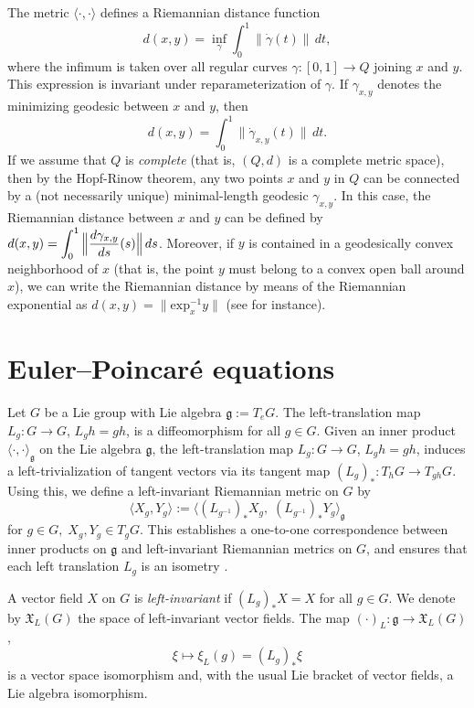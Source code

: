 \documentclass[letterpaper, 10 pt, conference]{ieeeconf}
\newcommand{\g}{\mathfrak{g}}
\begin{document}
The metric $\langle \cdot , \cdot \rangle$ defines a Riemannian distance function
\[
d(x,y) = \inf_{\gamma} \int_0^1 \|\dot{\gamma}(t)\|\, dt,
\]
where the infimum is taken over all regular curves $\gamma : [0,1] \to Q$ joining $x$ and $y$. 
This expression is invariant under reparameterization of $\gamma$. 
If $\gamma_{x,y}$ denotes the minimizing geodesic between $x$ and $y$, then 
\[
d(x,y) = \int_0^1 \|\dot{\gamma}_{x,y}(t)\|\, dt .
\] If we assume that $Q$ is \textit{complete} (that is, $(Q, d)$ is a complete metric space), then by the Hopf-Rinow theorem, any two points $x$ and $y$ in $Q$ can be connected by a (not necessarily unique) minimal-length geodesic $\gamma_{x,y}$. In this case, the Riemannian distance between $x$ and $y$ can be defined by $\displaystyle{d(x,y)=\int_{0}^{1}\Big{\|}\frac{d \gamma_{x,y}}{d s}(s)\Big{\|}\, ds}$. Moreover, if $y$ is contained in a geodesically convex neighborhood of $x$ (that is, the point $y$ must
belong to a convex open ball around $x$), we can write the Riemannian distance by means of the Riemannian exponential as $d(x,y)=\|\mbox{exp}_x^{-1}y\|$ (see \cite{bullo2019geometric} for instance). 

\section{Euler--Poincar\'e equations}\label{sec3}

Let $G$ be a Lie group with Lie algebra $\g := T_eG$. The left-translation map
$L_g : G \to G$, $L_g h = gh$, is a diffeomorphism for all $g\in G$. 
Given an inner product $\langle\cdot,\cdot\rangle_{\g}$ on the Lie algebra $\g$, 
the left-translation map $L_g : G \to G$, $L_g h = gh$, induces a left-trivialization 
of tangent vectors via its tangent map $(L_g)_\ast : T_h G \to T_{gh} G$.  
Using this, we define a left-invariant Riemannian metric on $G$ by
\[
\langle X_g, Y_g\rangle 
:= \big\langle (L_{g^{-1}})_\ast X_g,\; (L_{g^{-1}})_\ast Y_g\big\rangle_{\g}
\] for $g\in G,\; X_g,Y_g\in T_gG$. This establishes a one-to-one correspondence between inner products on $\g$ and 
left-invariant Riemannian metrics on $G$, and ensures that each left translation 
$L_g$ is an isometry \cite{goodman2022reduction}.

A vector field $X$ on $G$ is \emph{left-invariant} if $(L_g)_\ast X = X$ for all $g\in G$.
We denote by $\mathfrak{X}_L(G)$ the space of left-invariant vector fields. The map $(\cdot)_{L}:\g\to \mathfrak{X}_L(G)$,
\[
\xi \mapsto \xi_{L} (g) = (L_g)_\ast \xi
\]
is a vector space isomorphism and, with the usual Lie bracket of vector fields, a Lie algebra
isomorphism.
\end{document}
